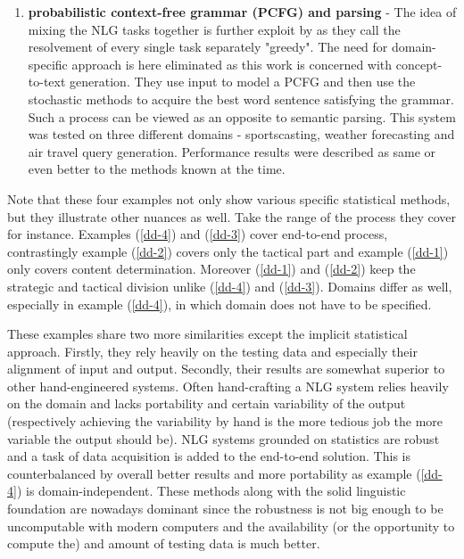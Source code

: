 \begin{enumerate}
	\item \textbf{probabilistic context-free grammar (PCFG) and parsing} - The idea of mixing the NLG tasks together is further exploit by \cite{konstas2013global} as they call the resolvement of every single task separately "greedy". The need for domain-specific approach is here eliminated as this work is concerned with concept-to-text generation. They use input to model a PCFG and then use the stochastic methods to acquire the best word sentence satisfying the grammar. Such a process can be viewed as an opposite to semantic parsing. This system was tested on three different domains - sportscasting, weather forecasting and air travel query generation. Performance results were described as same or even better to the methods known at the time.\label{dd-4}
\end{enumerate}
Note that these four examples not only show various specific statistical methods, but they illustrate other nuances as well. Take the range of the process they cover for instance. Examples (\ref{dd-4}) and (\ref{dd-3}) cover end-to-end process, contrastingly example (\ref{dd-2}) covers only the tactical part and example (\ref{dd-1}) only covers content determination. Moreover (\ref{dd-1}) and (\ref{dd-2}) keep the strategic and tactical division unlike (\ref{dd-4}) and (\ref{dd-3}). Domains differ as well, especially in example (\ref{dd-4}), in which domain does not have to be specified.

These examples share two more similarities except the implicit statistical approach. Firstly, they rely heavily on the testing data and especially their alignment of input and output. Secondly, their results are somewhat superior to other hand-engineered systems. Often hand-crafting a NLG system relies heavily on the domain and lacks portability and certain variability of the output (respectively achieving the variability by hand is the more tedious job the more variable the output should be). NLG systems grounded on statistics are robust and a task of data acquisition is added to the end-to-end solution. This is counterbalanced by overall better results and more portability as example (\ref{dd-4}) is domain-independent. These methods along with the solid linguistic foundation are nowadays dominant since the robustness is not big enough to be uncomputable with modern computers and the availability (or the opportunity to compute the) and amount of testing data is much better. 